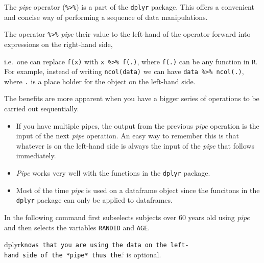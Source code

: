 \documentclass[
]{article}
\newenvironment{Shaded}{\begin{snugshade}}{\end{snugshade}}
\newcommand{\CommentTok}[1]{\textcolor[rgb]{0.56,0.35,0.01}{\textit{#1}}}
\newcommand{\DecValTok}[1]{\textcolor[rgb]{0.00,0.00,0.81}{#1}}
\newcommand{\KeywordTok}[1]{\textcolor[rgb]{0.13,0.29,0.53}{\textbf{#1}}}
\newcommand{\NormalTok}[1]{#1}
\newcommand{\OperatorTok}[1]{\textcolor[rgb]{0.81,0.36,0.00}{\textbf{#1}}}
\newcommand{\StringTok}[1]{\textcolor[rgb]{0.31,0.60,0.02}{#1}}
\begin{document}
The \emph{pipe} operator (\texttt{\%\textgreater{}\%}) is a part of the
\texttt{dplyr} package. This offers a convenient and concise way of
performing a sequence of data manipulations.

The operator \texttt{\%\textgreater{}\%} \emph{pipe} their value to the
left-hand of the operator forward into expressions on the right-hand
side,

i.e.~one can replace \texttt{f(x)} with
\texttt{x\ \%\textgreater{}\%\ f(.)}, where \texttt{f(.)} can be any
function in \texttt{R}. For example, instead of writing
\texttt{ncol(data)} we can have
\texttt{data\ \%\textgreater{}\%\ ncol(.)}, where \texttt{.} is a place
holder for the object on the left-hand side.

\begin{Shaded}
\end{Shaded}

The benefits are more apparent when you have a bigger series of
operations to be carried out sequentially.

\begin{itemize}
\item
  If you have multiple pipes, the output from the previous \emph{pipe}
  operation is the input of the next \emph{pipe} operation. An easy way
  to remember this is that whatever is on the left-hand side is always
  the input of the \emph{pipe} that follows immediately.
\item
  \emph{Pipe} works very well with the functions in the \texttt{dplyr}
  package.
\item
  Most of the time \emph{pipe} is used on a dataframe object since the
  funcitons in the \texttt{dplyr} package can only be applied to
  dataframes.
\end{itemize}

In the following command first subselects subjects over 60 years old
using \emph{pipe} and then selects the variables \texttt{RANDID} and
\texttt{AGE}.

dplyr\texttt{knows\ that\ you\ are\ using\ the\ data\ on\ the\ left-hand\ side\ of\ the\ *pipe*\ thus\ the}.`
is optional.

\begin{Shaded}
\end{Shaded}
\end{document}
